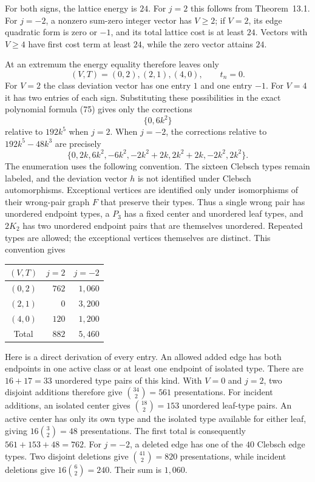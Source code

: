 For both signs, the lattice energy is $24$. For $j=2$ this follows from
Theorem~13.1. For $j=-2$, a nonzero sum-zero integer vector has $V\geq2$;
if $V=2$, its edge quadratic form is zero or $-1$, and its total lattice
cost is at least $24$. Vectors with $V\geq4$ have first cost term at
least $24$, while the zero vector attains $24$.

At an extremum the energy equality therefore leaves only
\[
 (V,T)=(0,2),(2,1),(4,0),\qquad t_n=0.
\]
For $V=2$ the class deviation vector has one entry $1$ and one entry
$-1$. For $V=4$ it has two entries of each sign. Substituting these
possibilities in the exact polynomial formula (75) gives only the
corrections
\[
 \{0,6k^2\}
\]
relative to $192k^5$ when $j=2$. When $j=-2$, the corrections relative
to $192k^5-48k^3$ are precisely
\[
 \{0,2k,6k^2,-6k^2,-2k^2+2k,2k^2+2k,-2k^2,2k^2\}.
\]
The enumeration uses the following convention. The sixteen Clebsch types
remain labeled, and the deviation vector $h$ is not identified under
Clebsch automorphisms. Exceptional vertices are identified only under
isomorphisms of their wrong-pair graph $F$ that preserve their types.
Thus a single wrong pair has unordered endpoint types, a $P_3$ has a
fixed center and unordered leaf types, and $2K_2$ has two unordered
endpoint pairs that are themselves unordered. Repeated types are allowed;
the exceptional vertices themselves are distinct. This convention gives
\begin{center}
\begin{tabular}{crr}
\toprule
$(V,T)$ & $j=2$ & $j=-2$\\
\midrule
$(0,2)$ & $762$ & $1,060$\\
$(2,1)$ & $0$ & $3,200$\\
$(4,0)$ & $120$ & $1,200$\\
\midrule
Total & $882$ & $5,460$\\
\bottomrule
\end{tabular}
\end{center}

Here is a direct derivation of every entry. An allowed added edge has
both endpoints in one active class or at least one endpoint of isolated
type. There are $16+17=33$ unordered type pairs of this kind. With $V=0$
and $j=2$, two disjoint additions therefore give $\binom{34}{2}=561$
presentations. For incident additions, an isolated center gives
$\binom{18}{2}=153$ unordered leaf-type pairs. An active center has only
its own type and the isolated type available for either leaf, giving
$16\binom{3}{2}=48$ presentations. The first total is consequently
$561+153+48=762$.
For $j=-2$, a deleted edge has one of the $40$ Clebsch edge types.
Two disjoint deletions give $\binom{41}{2}=820$ presentations, while
incident deletions give $16\binom{6}{2}=240$. Their sum is $1,060$.

